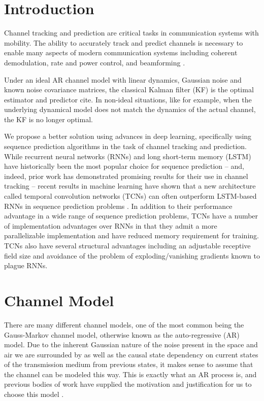 \documentclass[twocolumn,letterpaper]{IEEEAerospaceCLS}  %
\begin{document}
\tableofcontents

\section{Introduction}
\label{sec:intro}

Channel tracking and prediction are critical tasks in communication systems with mobility. The ability to accurately track and predict channels is necessary to enable many aspects of modern communication systems including coherent demodulation, rate and power control, and beamforming \cite{181202986}.

Under an ideal AR channel model with linear dynamics, Gaussian noise and known noise covariance matrices, the classical Kalman filter (KF) is the optimal estimator and predictor {\color{red} cite}.  In  non-ideal  situations,  like  for  example,  when  the underlying dynamical model does not match the dynamics of the actual channel, the KF is no longer optimal.

We propose a better solution using  advances in deep  learning, specifically using sequence prediction algorithms in the task of  channel  tracking  and  prediction. While recurrent neural networks (RNNs) and long short-term memory (LSTM) have historically been the most popular choice for sequence prediction -- and, indeed, prior work has demonstrated promising results for their use in channel tracking \cite{7508408} \cite{hochreiter1997long} -- recent results in machine learning have shown that a new architecture called temporal convolution networks (TCNs) can often outperform LSTM-based RNNs in sequence prediction problems \cite{BaiTCN2018}.  In addition to their performance advantage in a wide range of sequence prediction problems, TCNs have a number of implementation advantages over RNNs in that they admit a more parallelizable implementation and have reduced memory requirement for training. TCNs also have several structural advantages including an adjustable receptive field size and avoidance of the problem of exploding/vanishing gradients known to plague RNNs.


\section{Channel Model}
\label{sec:channelmodel}

There are many different channel models, one of the most common being the Gauss-Markov channel model, otherwise known as the auto-regressive (AR) model. Due to the inherent Gaussian nature of the noise present in the space and air we are surrounded by as well as the causal state dependency on current states of the transmission medium from previous states, it makes sense to assume that the channel can be modeled this way. This is exactly what an AR process is, and previous bodies of work have supplied the motivation and justification for us to choose this model \cite{181202986} \cite{baddour2001autoregressive}.
\end{document}
